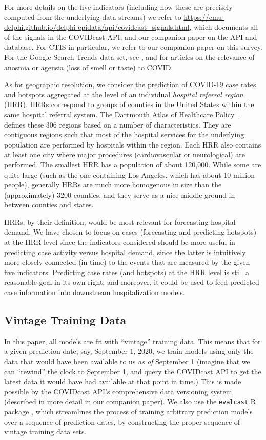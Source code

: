 \documentclass[9pt,twocolumn,twoside,lineno]{pnas-new}
\begin{document}
For more details on the five indicators (including how these are precisely
computed from the underlying data streams) we refer to
\url{https://cmu-delphi.github.io/delphi-epidata/api/covidcast_signals.html},
which documents all of the signals in the COVIDcast API, and our companion paper
on the API and database. For CTIS in particular, we refer to our companion paper
on this survey. For the Google Search Trends data set, see
\cite{GoogleSymptoms}, and \cite{Klopfen:2020, Vaira:2020} for articles on the
relevance of anosmia or ageusia (loss of smell or taste) to COVID.

As for geographic resolution, we consider the prediction of COVID-19 case rates
and hotspots aggregated at the level of an individual \textit{hospital referral
  region} (HRR). HRRs correspond to groups of counties in the United States
within the same hospital referral system. The Dartmouth Atlas of Healthcare 
Policy~\cite{DartmouthHRR}, defines these 306 regions based on a number of
characteristics. They are contiguous regions such that most of the hospital
services for the underlying population are performed by hospitals within the
region. Each HRR also contains at least one city where major procedures
(cardiovascular or neurological) are performed. The smallest HRR has a
population of about 120,000. While some are quite large (such as the one
containing Los Angeles, which has about 10 million people), generally HRRs 
are much more homogenous in size than the (approximately) 3200 counties,  
and they serve as a nice middle ground in between counties and states.  

HRRs, by their definition, would be most relevant for forecasting hospital
demand.  We have chosen to focus on cases (forecasting and predicting
hotspots) at the HRR level since the indicators considered should be more 
useful in predicting case activity versus hospital demand, since the latter is
intuitively more closely connected (in time) to the events that are measured by
the given five indicators. Predicting case rates (and hotspots) at the HRR level
is still a reasonable goal in its own right; and moreover, it could be used to
feed predicted case information into downstream hospitalization models.

\subsection{Vintage Training Data}

In this paper, all models are fit with ``vintage'' training data. This means
that for a given prediction date, say, September 1, 2020, we train models 
using only the data that would have been available to us \textit{as of}
September 1 (imagine that we can ``rewind'' the clock to September 1, and query
the COVIDcast API to get the latest data it would have had available at that
point in time.)  This is made possible by the COVIDcast API's comprehensive data   
versioning system (described in more detail in our companion paper).  We also
use the \texttt{evalcast} R package \cite{EvalcastR}, which streamlines the
process of training arbitrary prediction models over a sequence of prediction
dates, by constructing the proper sequence of vintage training data sets.   
\end{document}
